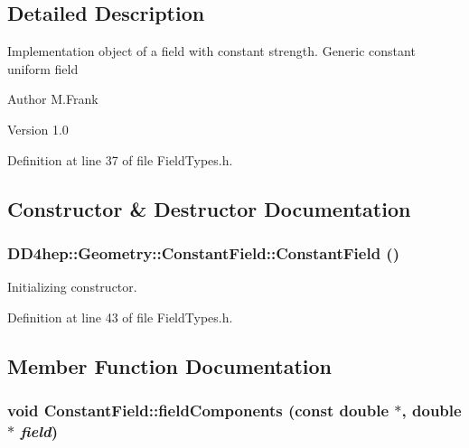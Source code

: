 \subsection{Detailed Description}
Implementation object of a field with constant strength. Generic constant uniform field

\begin{DoxyAuthor}{Author}
M.Frank 
\end{DoxyAuthor}
\begin{DoxyVersion}{Version}
1.0 
\end{DoxyVersion}


Definition at line 37 of file FieldTypes.h.

\subsection{Constructor \& Destructor Documentation}
\hypertarget{class_d_d4hep_1_1_geometry_1_1_constant_field_a2fb76b37024098548c0a190666c8d30a}{
\subsubsection[{ConstantField}]{\setlength{\rightskip}{0pt plus 5cm}DD4hep::Geometry::ConstantField::ConstantField ()}}
\label{class_d_d4hep_1_1_geometry_1_1_constant_field_a2fb76b37024098548c0a190666c8d30a}


Initializing constructor. 

Definition at line 43 of file FieldTypes.h.

\subsection{Member Function Documentation}
\hypertarget{class_d_d4hep_1_1_geometry_1_1_constant_field_a512fc8911c0c3e710b363c455c2c9ea9}{
\subsubsection[{fieldComponents}]{\setlength{\rightskip}{0pt plus 5cm}void ConstantField::fieldComponents (const double $\ast$, \/  double $\ast$ {\em field})}}
\label{class_d_d4hep_1_1_geometry_1_1_constant_field_a512fc8911c0c3e710b363c455c2c9ea9}


